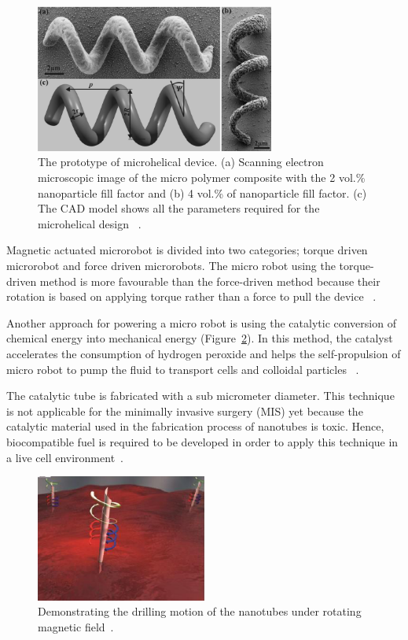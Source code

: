 \documentclass[12pt,a4paper,titlepage]{report}
\begin{document}
\begin{figure}
  \centering
    \includegraphics[width=0.7\textwidth]{8}
  \caption{ The prototype of microhelical device. (a) Scanning electron microscopic image of the micro polymer composite
with the 2 vol.\% nanoparticle fill factor and (b) 4 vol.\% of nanoparticle fill factor. (c) The CAD model
shows all the parameters required for the microhelical design ~\citep{peyer2013bacteria}.}
  \label{ref8}
\end{figure}

Magnetic actuated microrobot is divided into two categories; torque driven microrobot and force
 driven microrobots.
The micro robot using the torque-driven method is more favourable than the force-driven method 
because their rotation is based on applying torque rather than a force to pull the device ~\citep{peyer2013bacteria}.

Another approach for powering a micro robot is using the catalytic conversion of chemical energy
 into mechanical energy (Figure~\ref{nanotube}). In this method, the catalyst accelerates the consumption of hydrogen peroxide
 and helps the self-propulsion of micro robot to pump the fluid to transport cells and colloidal 
particles ~\citep{C2NR32798H}.

The catalytic tube is fabricated with a sub micrometer diameter.
 This technique is not applicable for the minimally invasive surgery (MIS) yet because the catalytic
 material used in the fabrication process of nanotubes is toxic. Hence, biocompatible fuel is required to be developed in order to 
apply this technique in a live cell environment~\citep{C2NR32798H}.


\begin{figure}
  \begin{center}
    \includegraphics[width=0.5\textwidth]{nanoJet3}
  \caption{Demonstrating the drilling motion of the nanotubes under rotating
 magnetic field~\citep{C2NR32798H}.}
  \label{nanotube}
\end{center}
\end{figure}
\end{document}
